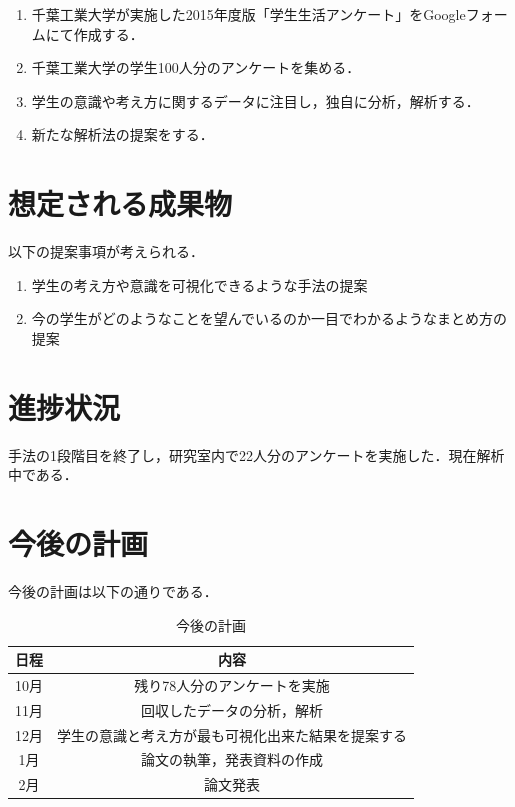 \documentclass[uplatex,twocolumn,dvipdfmx]{jsarticle}
\begin{document}
\begin{enumerate}
\item 千葉工業大学が実施した2015年度版「学生生活アンケート」をGoogleフォームにて作成する．
\item 千葉工業大学の学生100人分のアンケートを集める．
\item 学生の意識や考え方に関するデータに注目し，独自に分析，解析する．
\item 新たな解析法の提案をする．
\end{enumerate}

\section{想定される成果物}
以下の提案事項が考えられる．
\begin{enumerate}
\item 学生の考え方や意識を可視化できるような手法の提案
\item 今の学生がどのようなことを望んでいるのか一目でわかるようなまとめ方の提案
\end{enumerate}

\section{進捗状況}
手法の1段階目を終了し，研究室内で22人分のアンケートを実施した．現在解析中である．
\section{今後の計画}

今後の計画は以下の通りである．
\begin{table}[hbtp]
  \caption{今後の計画}
  \label{table:data_type}
  \centering
  \begin{tabular}{cc}
    \hline
    日程 & 内容  \\ \hline \hline
    10月 & 残り78人分のアンケートを実施 \\
    11月 & 回収したデータの分析，解析 \\
    12月 & 学生の意識と考え方が最も可視化出来た結果を提案する \\
    1月 & 論文の執筆，発表資料の作成 \\
2月 & 論文発表\\
 \hline
  \end{tabular}
\end{table}



\end{document}
